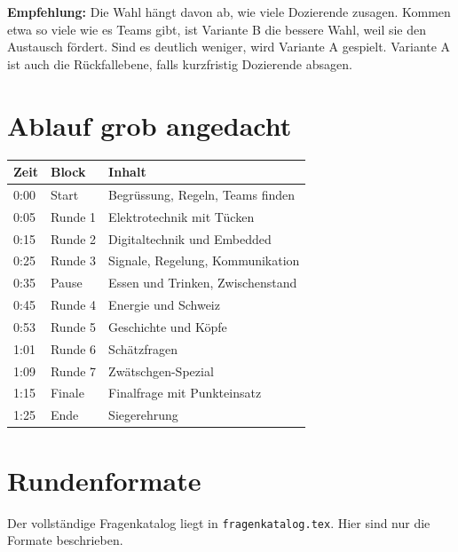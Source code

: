 \documentclass[a4paper,11pt]{article}
\begin{document}
\medskip
\noindent\textbf{Empfehlung:} Die Wahl hängt davon ab, wie viele Dozierende zusagen. Kommen etwa so viele wie es Teams gibt, ist Variante B die bessere Wahl, weil sie den Austausch fördert. Sind es deutlich weniger, wird Variante A gespielt. Variante A ist auch die Rückfallebene, falls kurzfristig Dozierende absagen.

\section{Ablauf grob angedacht}
\begin{tabularx}{\textwidth}{@{}l l X@{}}
\toprule
\textbf{Zeit} & \textbf{Block} & \textbf{Inhalt} \\
\midrule
0:00 & Start & Begrüssung, Regeln, Teams finden \\
0:05 & Runde 1 & Elektrotechnik mit Tücken \\
0:15 & Runde 2 & Digitaltechnik und Embedded \\
0:25 & Runde 3 & Signale, Regelung, Kommunikation \\
0:35 & Pause & Essen und Trinken, Zwischenstand \\
0:45 & Runde 4 & Energie und Schweiz \\
0:53 & Runde 5 & Geschichte und Köpfe \\
1:01 & Runde 6 & Schätzfragen \\
1:09 & Runde 7 & Zwätschgen-Spezial \\
1:15 & Finale & Finalfrage mit Punkteinsatz \\
1:25 & Ende & Siegerehrung \\
\bottomrule
\end{tabularx}

\section{Rundenformate}
Der vollständige Fragenkatalog liegt in \texttt{fragenkatalog.tex}. Hier sind nur die Formate beschrieben.
\end{document}
